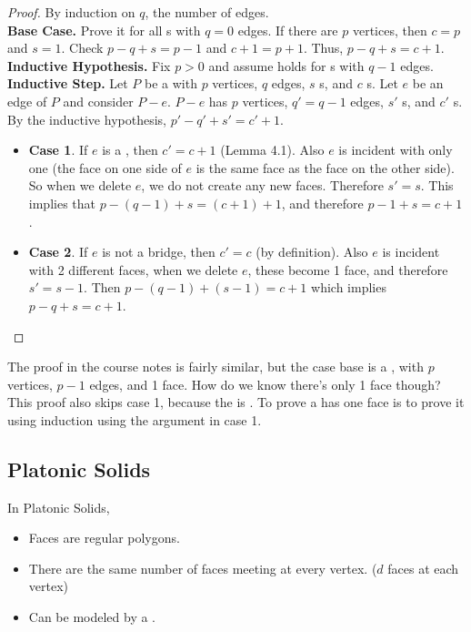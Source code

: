 \documentclass[english, 11pt]{article}
\begin{document}
\begin{proof}
  By induction on $q$, the number of edges. \\

  \textbf{Base Case.} Prove it for all  s with $q = 0$ edges. If there are $p$ vertices, then $c = p$ and $s = 1$. Check $p - q + s = p - 1$ and $c + 1 = p + 1$. Thus, $p - q + s = c + 1$. \\

  \textbf{Inductive Hypothesis.} Fix $p > 0$ and assume  holds for s with $q - 1$ edges. \\

  \textbf{Inductive Step.} Let $P$ be a  with $p$ vertices, $q$ edges, $s$ s, and $c$ s. Let $e$ be an edge of $P$ and consider $P - e$. $P-e$ has $p$ vertices, $q' = q - 1$ edges, $s'$ s, and $c'$ s. By the inductive hypothesis, $p' - q' + s' = c' + 1$.
  \begin{itemize}
    \item \textbf{Case 1}. If $e$ is a , then $c' = c + 1$ (Lemma 4.1). Also $e$ is incident with only one  (the face on one side of $e$ is the same face as the face on the other side). So when we delete $e$, we do not create any new faces. Therefore $s' = s$. This implies that $p - (q-1) + s = (c+1) + 1$, and therefore $p - 1 + s = c + 1$.
    \item \textbf{Case 2}. If $e$ is not a bridge, then $c' = c$ (by definition). Also $e$ is incident with 2 different faces, when we delete $e$, these become 1 face, and therefore $s' = s - 1$. Then $p - (q - 1) + (s - 1) = c + 1$ which implies $p - q + s = c + 1$.
  \end{itemize}
\end{proof}
The proof in the course notes is fairly similar, but the case base is a , with $p$ vertices, $p - 1$ edges, and 1 face. How do we know there's only 1 face though? This proof also skips case 1, because the  is . To prove a  has one face is to prove it using induction using the argument in case 1.

\subsection{Platonic Solids}

In Platonic Solids,
\begin{itemize}
  \item Faces are regular polygons.
  \item There are the same number of faces meeting at every vertex. ($d$ faces at each vertex)
  \item Can be modeled by a .
\end{itemize}
\end{document}
